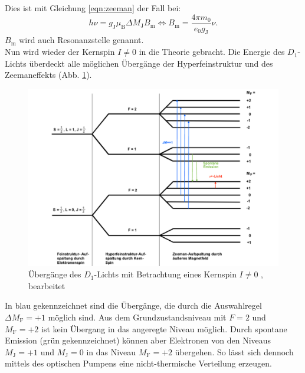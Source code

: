 Dies ist mit Gleichung \eqref{eqn:zeeman} der Fall bei:
\begin{equation}
  h \nu = g_{\text{J}} \mu_{\text{B}} \Delta M_{\text{J}} B_{\text{m}} \Leftrightarrow B_{\text{m}} = \frac{4 \pi m_{0}}{e_{0} g_{\text{J}}} \nu.
\label{eqn:resonanz}
\end{equation}
$B_{\text{m}}$ wird auch Resonanzstelle genannt.
%
%
\\Nun wird wieder der Kernspin $I≠0$ in die Theorie gebracht.
Die Energie des $D_{1}$-Lichts überdeckt alle möglichen Übergänge der Hyperfeinstruktur und des Zeemaneffekts (Abb. \ref{fig:übergänge}).
\begin{figure}[h!]
  \centering
  \includegraphics[width=\textwidth]{übergänge.pdf}
  \caption{Übergänge des $D_{1}$-Lichts mit Betrachtung eines Kernspin $I≠0$ \cite{1}, bearbeitet}
  \label{fig:übergänge}
\end{figure}
In blau gekennzeichnet sind die Übergänge, die durch die Auswahlregel $\Delta M_{\text{F}}=+1$ möglich sind.
Aus dem Grundzustandsniveau mit $F=2$ und $M_{\text{F}}=+2$ ist kein Übergang in das angeregte Niveau möglich.
Durch spontane Emission (grün gekennzeichnet) können aber Elektronen von den Niveaus $M_{\text{J}}=+1$ und $M_{\text{J}}=0$ in das Niveau $M_{\text{F}}=+2$ übergehen.
So lässt sich dennoch mittels des optischen Pumpens eine nicht-thermische Verteilung erzeugen.
